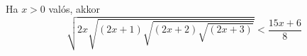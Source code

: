    Ha $x>0$ valós, akkor
   \begin{equation*}
   \sqrt{ 2x\sqrt{(2x+1)\sqrt{(2x+2)\sqrt{(2x+3)}}}}<\frac{15x+6}{8}
   \end{equation*}
